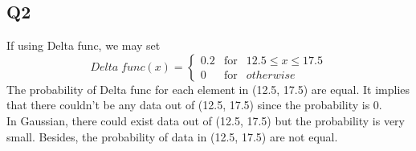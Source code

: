 \documentclass [12pt] {article}
\begin{document}
	\subsection {Q2}
	If using Delta func, we may set
	\[Delta \;func(x) = \left\{ \begin{array}{rcl} 0.2 & \mbox{for} & 12.5\leq x\leq17.5 \\
												0 & \mbox{for} & otherwise\end{array} \right.\]
	The probability of Delta func for each element in (12.5, 17.5) are equal. It implies that there couldn't be any data out of (12.5, 17.5) since the probability is 0.\\
	In Gaussian, there could exist data out of (12.5, 17.5) but the probability is very small. Besides, the probability of data in (12.5, 17.5) are not equal.
\end{document}

